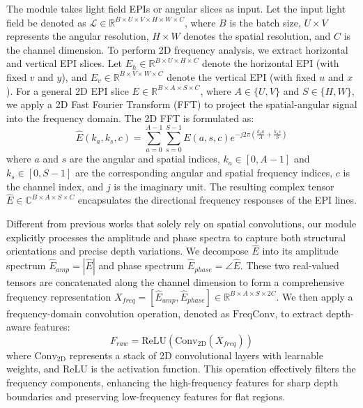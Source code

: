 The module takes light field EPIs or angular slices as input. Let the input light field be denoted as $\mathcal{L} \in \mathbb{R}^{B \times U \times V \times H \times W \times C}$, where $B$ is the batch size, $U \times V$ represents the angular resolution, $H \times W$ denotes the spatial resolution, and $C$ is the channel dimension. To perform 2D frequency analysis, we extract horizontal and vertical EPI slices. Let $E_{h} \in \mathbb{R}^{B \times U \times H \times C}$ denote the horizontal EPI (with fixed $v$ and $y$), and $E_{v} \in \mathbb{R}^{B \times V \times W \times C}$ denote the vertical EPI (with fixed $u$ and $x$). For a general 2D EPI slice $E \in \mathbb{R}^{B \times A \times S \times C}$, where $A \in \{U, V\}$ and $S \in \{H, W\}$, we apply a 2D Fast Fourier Transform (FFT) to project the spatial-angular signal into the frequency domain. The 2D FFT is formulated as:
\begin{equation}
\label{eq:eq20}
\hat{E}(k_a, k_s, c) = \sum_{a=0}^{A-1} \sum_{s=0}^{S-1} E(a, s, c) e^{-j 2\pi \left(\frac{k_a a}{A} + \frac{k_s s}{S}\right)}
\end{equation}
where $a$ and $s$ are the angular and spatial indices, $k_a \in [0, A-1]$ and $k_s \in [0, S-1]$ are the corresponding angular and spatial frequency indices, $c$ is the channel index, and $j$ is the imaginary unit. The resulting complex tensor $\hat{E} \in \mathbb{C}^{B \times A \times S \times C}$ encapsulates the directional frequency responses of the EPI lines.

Different from previous works that solely rely on spatial convolutions, our module explicitly processes the amplitude and phase spectra to capture both structural orientations and precise depth variations. We decompose $\hat{E}$ into its amplitude spectrum $\hat{E}_{amp} = |\hat{E}|$ and phase spectrum $\hat{E}_{phase} = \angle \hat{E}$. These two real-valued tensors are concatenated along the channel dimension to form a comprehensive frequency representation $X_{freq} = [\hat{E}_{amp}, \hat{E}_{phase}] \in \mathbb{R}^{B \times A \times S \times 2C}$. We then apply a frequency-domain convolution operation, denoted as $\text{FreqConv}$, to extract depth-aware features:
\begin{equation}
\label{eq:eq21}
F_{raw} = \text{ReLU}\left( \text{Conv}_{2\text{D}}(X_{freq}) \right)
\end{equation}
where $\text{Conv}_{2\text{D}}$ represents a stack of 2D convolutional layers with learnable weights, and $\text{ReLU}$ is the activation function. This operation effectively filters the frequency components, enhancing the high-frequency features for sharp depth boundaries and preserving low-frequency features for flat regions.

